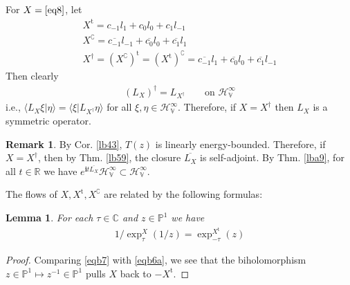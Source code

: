 \documentclass[12pt,b5paper,notitlepage]{article}
\theoremstyle{definition}
\newtheorem{rem}[df]{Remark}
\theoremstyle{plain}
\newtheorem{lm}[df]{Lemma}
\newcommand{\ovl}{\overline}
\newcommand{\tr}{\mathrm{t}} %
\newcommand{\bk}[1]{\langle {#1}\rangle}
\newcommand{\im}{\mathbf{i}}
\newcommand{\Co}{\complement}
\newcommand{\Cbb}{\mathbb C}
\newcommand{\Pbb}{\mathbb P}
\newcommand{\Rbb}{\mathbb R}
\newcommand{\HV}{\mathcal H_{\mathbb V}}
\numberwithin{equation}{section}
\begin{document}
\subsection{}
For $X=\eqref{eq8}$, let
\begin{subequations}\label{eqb6}
\begin{gather}
X^\tr=c_{-1}l_1+c_0l_0+c_1l_{-1}\label{eqb6a}\\
X^\Co=\ovl {c_{-1}}l_{-1}+\ovl{c_0}l_0+\ovl {c_1} l_1\\
 X^\dagger=(X^\Co)^\tr=(X^\tr)^\Co=\ovl {c_{-1}}l_1+\ovl {c_0}l_0+\ovl {c_1} l_{-1}
\end{gather}
\end{subequations}
Then clearly
\begin{align*}
(L_X)^\dagger=L_{X^\dagger}\qquad\text{on $\HV^\infty$}
\end{align*}
i.e., $\bk{L_X\xi|\eta}=\bk{\xi|L_{X^\dagger}\eta}$ for all $\xi,\eta\in\HV^\infty$. Therefore, if $X=X^\dagger$ then $L_X$ is a symmetric operator.

\begin{rem}\label{lb75}
By Cor. \ref{lb43}, $T(z)$ is linearly energy-bounded. Therefore, if $X=X^\dagger$, then by Thm. \ref{lb59}, the closure $\ovl{L_X}$ is self-adjoint. By Thm. \ref{lba9}, for all $t\in\Rbb$ we have $e^{\im t\ovl{L_X}}\HV^\infty\subset\HV^\infty$.
\end{rem}


The flows of  $X,X^\tr,X^\Co$ are related by the following formulas:

\begin{lm}\label{lb73}
For each $\tau\in\Cbb$ and $z\in\Pbb^1$ we have
\begin{align}\label{eqb9}
1/\exp_\tau^X(1/z)=\exp_{-\tau}^{X^\tr}(z)
\end{align}
\end{lm}
\begin{proof}
Comparing \eqref{eqb7} with \eqref{eqb6a}, we see that the biholomorphism $z\in\Pbb^1\mapsto z^{-1}\in\Pbb^1$ pulls $X$ back to $-X^\tr$.
\end{proof}
\end{document}
